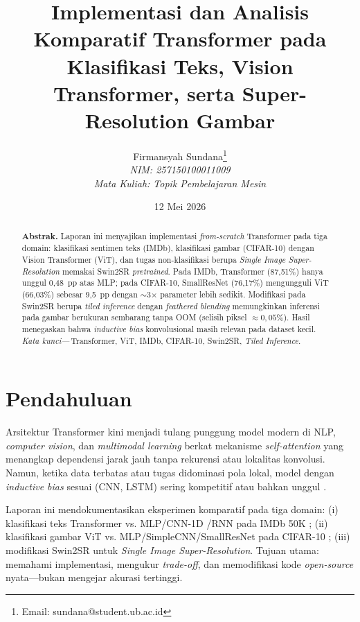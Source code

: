 \documentclass[10pt,conference,a4paper]{article}
\title{\vspace{-0.4cm}\bfseries\Large
  Implementasi dan Analisis Komparatif Transformer pada Klasifikasi Teks, Vision Transformer, serta Super-Resolution Gambar
}
\author{
  Firmansyah Sundana\thanks{Email: sundana@student.ub.ac.id}\\
  \textit{NIM: 257150100011009}\\
  \textit{Mata Kuliah: Topik Pembelajaran Mesin}
}
\date{12 Mei 2026}
\begin{document}
\maketitle
\begin{abstract}
\noindent\textbf{Abstrak.}
Laporan ini menyajikan implementasi \emph{from-scratch} Transformer pada tiga domain: klasifikasi sentimen teks (IMDb), klasifikasi gambar (CIFAR-10) dengan Vision Transformer (ViT), dan tugas non-klasifikasi berupa \emph{Single Image Super-Resolution} memakai Swin2SR \emph{pretrained}. Pada IMDb, Transformer (87{,}51\%) hanya unggul 0{,}48~pp atas MLP; pada CIFAR-10, SmallResNet (76{,}17\%) mengungguli ViT (66{,}03\%) sebesar 9{,}5~pp dengan $\sim$3$\times$ parameter lebih sedikit. Modifikasi pada Swin2SR berupa \emph{tiled inference} dengan \emph{feathered blending} memungkinkan inferensi pada gambar berukuran sembarang tanpa OOM (selisih piksel $\approx 0{,}05\%$). Hasil menegaskan bahwa \emph{inductive bias} konvolusional masih relevan pada dataset kecil. \\
\textit{Kata kunci---}\,Transformer, ViT, IMDb, CIFAR-10, Swin2SR, \emph{Tiled Inference}.
\end{abstract}

\section{Pendahuluan}

Arsitektur Transformer \cite{vaswani2017} kini menjadi tulang punggung model modern di NLP, \emph{computer vision}, dan \emph{multimodal learning} berkat mekanisme \emph{self-attention} yang menangkap dependensi jarak jauh tanpa rekurensi atau lokalitas konvolusi. Namun, ketika data terbatas atau tugas didominasi pola lokal, model dengan \emph{inductive bias} sesuai (CNN, LSTM) sering kompetitif atau bahkan unggul \cite{dosovitskiy2021}.

Laporan ini mendokumentasikan eksperimen komparatif pada tiga domain: (i) klasifikasi teks Transformer vs. MLP/CNN-1D \cite{kim2014}/RNN pada IMDb 50K \cite{maas2011}; (ii) klasifikasi gambar ViT \cite{dosovitskiy2021} vs. MLP/SimpleCNN/SmallResNet \cite{he2016} pada CIFAR-10 \cite{krizhevsky2009}; (iii) modifikasi Swin2SR \cite{conde2022,liang2021} untuk \emph{Single Image Super-Resolution}. Tujuan utama: memahami implementasi, mengukur \emph{trade-off}, dan memodifikasi kode \emph{open-source} nyata---bukan mengejar akurasi tertinggi.
\end{document}

